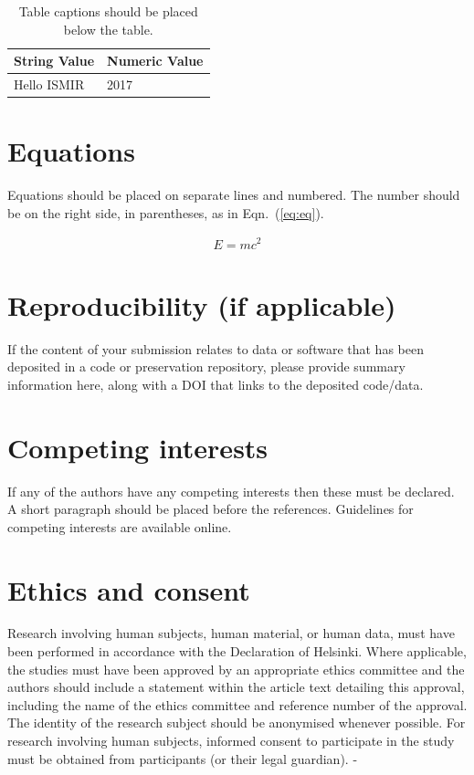 \documentclass{article}
\begin{document}
\begin{table}[htpb]
\centering
  \begin{tabular}{ll}
  \toprule
  \bfseries String Value & \bfseries Numeric Value \\ \midrule
  Hello ISMIR  & 2017          \\
  \bottomrule
  \end{tabular}
  \caption{Table captions should be placed below the table.}
\label{tab:table}
\end{table}

\section{Equations}\label{sec:equations}

Equations should be placed on separate lines and numbered.
The number should be on the right side, in parentheses,
as in Eqn.~(\ref{eq:eq}).

\begin{align}\label{eq:eq}
E = mc^2
\end{align}

\section{Reproducibility (if applicable)}

If the content of your submission relates to data or software
that has been deposited in a code or preservation repository,
please provide summary information here, along with a DOI that
links to the deposited code/data.

\section{Competing interests}

If any of the authors have any competing interests then these
must be declared. A short paragraph should be placed before
the references.
Guidelines for competing interests are available online.%

\section{Ethics and consent}

Research involving human subjects, human material, or human data,
must have been performed in accordance with the Declaration of Helsinki.
Where applicable, the studies must have been approved by an appropriate
ethics committee and the authors should include a statement within
the article text detailing this approval, including the name of the ethics committee and reference number of the approval.
The identity of the research subject should be anonymised whenever possible.
For research involving human subjects, informed consent to participate
in the study must be obtained from participants (or their legal guardian).
-
\end{document}
